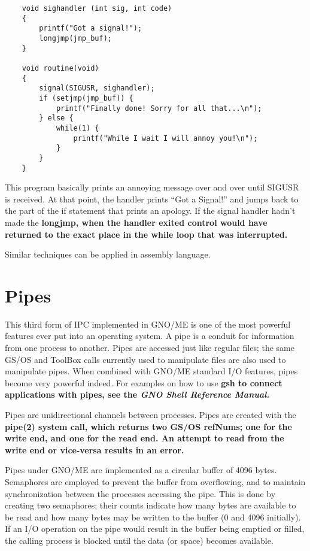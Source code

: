 \documentclass{report}
\begin{document}
\begin{verbatim}
    void sighandler (int sig, int code)
    {
        printf("Got a signal!");
        longjmp(jmp_buf);
    }

    void routine(void)
    {
        signal(SIGUSR, sighandler);
        if (setjmp(jmp_buf)) {
            printf("Finally done! Sorry for all that...\n");
        } else {
            while(1) {
                printf("While I wait I will annoy you!\n");
            }
        }
    }
\end{verbatim}


This program basically prints an annoying
message over and over until SIGUSR is received. At that point,
the handler prints ``Got a Signal!'' and jumps back to
the part of the if statement that prints an apology. If the
signal handler hadn't made the \bf longjmp\rm, when the handler
exited control would have returned to the exact place in the \bf while \rm
loop that was interrupted.

Similar techniques can be applied in assembly language.

\section{Pipes}

This third form of IPC implemented in
GNO/ME is one of the most powerful features ever put into an
operating system. A pipe is a conduit for information from one
process to another. Pipes are accessed just like regular files;
the same GS/OS and ToolBox calls currently used to manipulate
files are also used to manipulate pipes. When combined with
GNO/ME standard I/O features, pipes become very powerful indeed.
For examples on how to use \bf gsh \rm to connect applications
with pipes, see the \it GNO Shell Reference Manual\rm.

Pipes are unidirectional channels between
processes. Pipes are created with the \bf pipe\rm(2) system call,
which returns two GS/OS refNums; one for the write end, and one
for the read end. An attempt to read from the write end or
vice-versa results in an error.

Pipes under GNO/ME are implemented as a
circular buffer of 4096 bytes. Semaphores are employed to prevent
the buffer from overflowing, and to maintain synchronization
between the processes accessing the pipe. This is done by
creating two semaphores; their counts indicate how many bytes are
available to be read and how many bytes may be written to the
buffer (0 and 4096 initially). If an I/O operation on the pipe
would result in the buffer being emptied or filled, the calling
process is  blocked until the data (or space)
becomes available.
\end{document}
